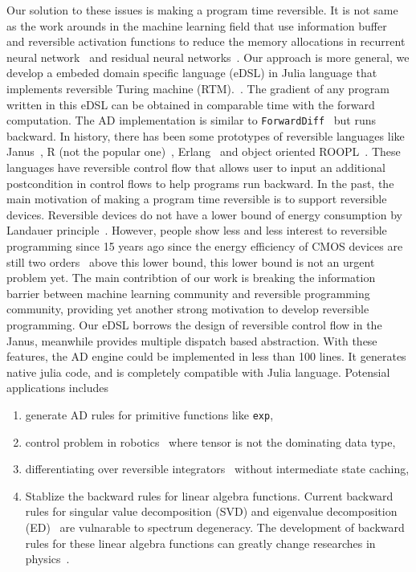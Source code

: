 \documentclass[aps,twocolumn,longbibliography,english,superscriptaddress,prr]{revtex4-1}
\newcommand{\<}{\langle}
\renewcommand{\>}{\rangle}
\theoremstyle{definition}\newtheorem{definition}{\textit{Definition}}
\begin{document}

Our solution to these issues is making a program time reversible. It is not same as the work arounds in the machine learning field that use information buffer~\cite{Maclaurin2015} and reversible activation functions to reduce the memory allocations in recurrent neural network~\cite{MacKay2018} and residual neural networks~\cite{Behrmann2018}. Our approach is more general, we develop a embeded domain specific language (eDSL) in Julia language that implements reversible Turing machine (RTM).~\cite{Perumalla2013,Frank2017}.
The gradient of any program written in this eDSL can be obtained in comparable time with the forward computation. The AD implementation is similar to \texttt{ForwardDiff}~\cite{Revels2016} but runs backward.
    In history, there has been some prototypes of reversible languages like Janus~\cite{Lutz1986}, R (not the popular one)~\cite{Frank1997}, Erlang~\cite{Lanese2018} and object oriented ROOPL~\cite{Haulund2017}. These languages have reversible control flow that allows user to input an additional postcondition in control flows to help programs run backward.
    In the past, the main motivation of making a program time reversible is to support reversible devices. Reversible devices do not have a lower bound of energy consumption by Landauer principle~\cite{Landauer1961}. However, people show less and less interest to reversible programming since 15 years ago since the energy efficiency of CMOS devices are still two orders~\cite{Frank2017} above this lower bound, this lower bound is not an urgent problem yet.
    The main contribtion of our work is breaking the information barrier between machine learning community and reversible programming community, providing yet another strong motivation to develop reversible programming.
    Our eDSL borrows the design of reversible control flow in the Janus, meanwhile provides multiple dispatch based abstraction. With these features, the AD engine could be implemented in less than 100 lines. It generates native julia code, and is completely compatible with Julia language.
Potensial applications includes
\begin{enumerate}
    \item generate AD rules for primitive functions like \texttt{exp},
    \item control problem in robotics~\cite{Giftthaler2017} where tensor is not the dominating data type,
    \item differentiating over reversible integrators~\cite{Laikov2018} without intermediate state caching,
    \item Stablize the backward rules for linear algebra functions. Current backward rules for singular value decomposition (SVD) and eigenvalue decomposition (ED)~\cite{Seeger2017,Wan2019,Hubig2019} are vulnarable to spectrum degeneracy. The development of backward rules for these linear algebra functions can greatly change researches in physics~\cite{Xie2020,Liao2019}.

\end{enumerate}
\end{document}
